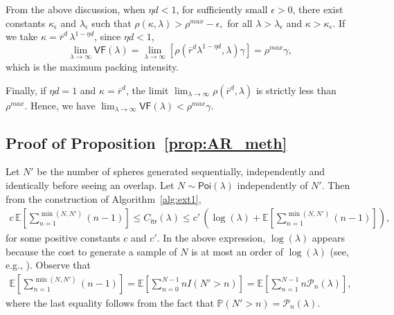 \documentclass[11pt]{article}
\newcommand{\pp}{\mathbb{P}}
\newcommand{\ee}{\mathbb{E}}
\newcommand{\rbdd}{\overline{r}}
\newcommand{\lt}{\left}
\newcommand{\rt}{\right}
\newcommand{\pois}{\mathsf{Poi}}
\newcommand{\pnon}{\mathcal{P}_n(\lambda)}
\begin{document}
\begin{appendices}
From the above discussion, when $\eta d < 1$, for sufficiently small $\epsilon > 0$, there exist constants $\kappa_\epsilon$ and $\lambda_\epsilon$ such that 
$\rho(\kappa, \lambda) > \rho^{max} - \epsilon,$
for all $\lambda > \lambda_\epsilon$ and $\kappa > \kappa_\epsilon$.
If we take $\kappa = \rbdd^d\,\lambda^{1- \eta d}$, since $\eta d< 1$,
\[
 \lim_{\lambda \to \infty} \mathsf{VF}(\lambda) = \lim_{\lambda \to \infty} \lt[\rho(\rbdd^d\lambda^{1- \eta d}, \lambda) \gamma  \rt] = \rho^{max} \gamma,
\] 
which is the maximum packing intensity.

Finally, if $\eta d = 1$ and $\kappa = \rbdd^d$, the limit $\lim_{\lambda \to \infty} \rho(\rbdd^d, \lambda)$ is strictly less than $\rho^{max}$. Hence, we have $\lim_{\lambda \to \infty} \mathsf{VF}(\lambda) < \rho^{max} \gamma$.




\subsection{Proof of Proposition~\ref{prop:AR_meth}}
\label{sec:ComResults}


\newcommand{\pnonn}{\mathcal{P}_{n-1}}
Let $N'$ be the number of spheres generated sequentially, independently and identically before seeing an overlap. {Let $N \sim \pois(\lambda)$ independently of $N'$.}
Then from the construction of Algorithm~\ref{alg:ext1},
\begin{align}
\label{eqn:citr_1}
c\,\ee\lt[\sum_{n=1}^{\min(N, N')} (n-1)\rt]  \leq C_{\mathsf{itr}}(\lambda) \leq  c'\,\lt(\log(\lambda) + \ee\lt[\sum_{n=1}^{\min(N, N')} (n-1) \rt] \rt),
\end{align} 
for some positive constants $c$ and $c'$. In the above expression, $\log(\lambda)$ appears because the cost to generate a sample of $N$ is at most an order of $\log(\lambda)$ (see, e.g., \cite{Dev86}). 
Observe that
\begin{align}
\label{eqn:C_itr}
\ee\lt[\sum_{n=1}^{\min(N, N')} (n-1) \rt] = \ee\lt[\sum_{n=0}^{N -1} n I(N' > n) \rt] = \ee\lt[\sum_{n=1}^{N-1} n \pnon \rt],
\end{align}
where the last equality follows from the fact that $\pp(N' > n) = \pnon$.\\



\end{appendices}
\end{document}
